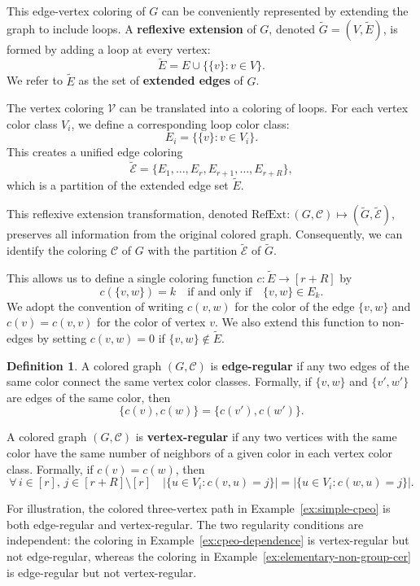 \documentclass[12pt]{amsart}
\theoremstyle{plain}
\theoremstyle{definition}
\newtheorem{definition}[theorem]{Definition}
\theoremstyle{remark}
\newcommand{\1}{\mathbf{1}}
\newcommand{\RefExt}{\mathrm{RefExt}}
\begin{document}
This edge-vertex coloring of $G$ can be conveniently represented by extending the graph to include loops. A \textbf{reflexive extension} of \(G\), denoted \(\tilde{G} = (V,\tilde{E})\), is formed by adding a loop at every vertex: 
\[
\tilde{E} = E\cup \{\{v\}\colon v\in V\}.
\]
We refer to \(\tilde E\) as the set of \textbf{extended edges} of \(G\). 

The vertex coloring \(\mathcal{V}\) can be translated into a coloring of loops. 
For each vertex color class \(V_i\), we define a corresponding loop color class:
\[
E_i = \big\{\{v\}\colon v\in V_i\big\}.
\]
This creates a unified edge coloring
\[
\tilde{\mathcal{E}} = \{E_1,\ldots,E_r,E_{r+1},\ldots,E_{r+R}\},
\] 
which is a partition of the extended edge set \(\tilde{E}\).

This reflexive extension transformation, denoted \(\RefExt\colon(G, \mathcal{C}) \mapsto (\tilde{G}, \tilde{\mathcal{E}})\), preserves all information from the original colored graph. Consequently, we can identify the coloring $\mathcal{C}$ of $G$ with the partition \(\tilde{\mathcal{E}}\) of \(\tilde{G}\).

This allows us to define a single coloring function \(c\colon \tilde{E}\to [r+R]\) by 
\[
c(\{v, w\}) = k \quad \text{if and only if} \quad \{v, w\} \in E_k.
\]
We adopt the convention of writing \(c(v,w)\) for the color of the edge \(\{v,w\}\) and \(c(v) = c(v,v)\) for the color of vertex \(v\). 
We also extend this function to non-edges by setting $c(v,w)=0$ if $\{v,w\}\notin\tilde E$. %
 

\begin{definition}
A colored graph $(G,\mathcal{C})$ is \textbf{edge-regular} if any two edges of the same color connect the
same vertex color classes. Formally, if $\{v,w\}$ and $\{v',w'\}$ are edges of the same color, then
\[
\{c(v),c(w)\}=\{c(v'),c(w')\}.
\]

A colored graph  $(G,\mathcal{C})$ is \textbf{vertex-regular} if any two vertices with the same color have the same number of neighbors of a given color in each vertex color class. Formally, if $c(v)=c(w)$, then 
\[
\forall\,i\in [r],\, j\in[r+R]\setminus[r] \quad |\{ u\in V_i\colon c(v,u)=j \}| = |\{ u\in V_i\colon c(w,u) = j\}|.
\]
\end{definition}
For illustration, the colored three-vertex path in
Example~\ref{ex:simple-cpeo} is both edge-regular and vertex-regular.
The two regularity conditions are independent: the coloring in
Example~\ref{ex:cpeo-dependence} is vertex-regular but not edge-regular,
whereas the coloring in Example~\ref{ex:elementary-non-group-cer} is
edge-regular but not vertex-regular.
\end{document}
